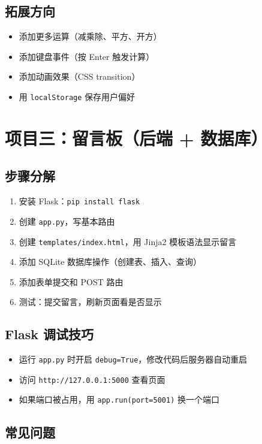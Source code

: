 \documentclass[a4paper,12pt]{ctexart}
\begin{document}
\subsection*{拓展方向}

\begin{itemize}
  \item 添加更多运算（减乘除、平方、开方）
  \item 添加键盘事件（按 Enter 触发计算）
  \item 添加动画效果（CSS transition）
  \item 用 \texttt{localStorage} 保存用户偏好
\end{itemize}

\section*{项目三：留言板（后端 + 数据库）}

\subsection*{步骤分解}

\begin{enumerate}
  \item 安装 Flask：\texttt{pip install flask}
  \item 创建 \texttt{app.py}，写基本路由
  \item 创建 \texttt{templates/index.html}，用 Jinja2 模板语法显示留言
  \item 添加 SQLite 数据库操作（创建表、插入、查询）
  \item 添加表单提交和 POST 路由
  \item 测试：提交留言，刷新页面看是否显示
\end{enumerate}

\subsection*{Flask 调试技巧}

\begin{itemize}
  \item 运行 \texttt{app.py} 时开启 \texttt{debug=True}，修改代码后服务器自动重启
  \item 访问 \texttt{http://127.0.0.1:5000} 查看页面
  \item 如果端口被占用，用 \texttt{app.run(port=5001)} 换一个端口
\end{itemize}

\subsection*{常见问题}
\end{document}
